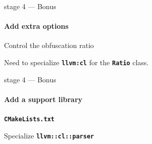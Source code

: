 \documentclass[14pt]{beamer}
\newcommand{\Code}[1]{\textbf{\texttt{#1}}}
\begin{document}
    \begin{frame}[containsverbatim]{stage 4 --- Bonus}
        \framesubtitle{Add extra options}
        \begin{alertblock}{Control the obfuscation ratio}
        {
        \scriptsize
        
        }
        \end{alertblock}
        \vspace{.1em}
        \structure{$\Rightarrow$} Need to specialize \Code{llvm:cl} for the \Code{Ratio} class.
    \end{frame}


    \begin{frame}{stage 4 --- Bonus}
        \framesubtitle{Add a support library}
        \begin{alertblock}{\Code{CMakeLists.txt}}
            \begin{minipage}{\textwidth}
            \scriptsize
            
            \end{minipage}
        \end{alertblock}

        \begin{alertblock}{Specialize \Code{llvm::cl::parser}}
            \begin{minipage}{\textwidth}
            \scriptsize
            
            \end{minipage}
        \end{alertblock}
    \end{frame}
\end{document}
